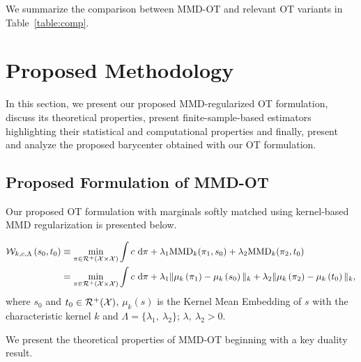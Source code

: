 We summarize the comparison between MMD-OT and relevant OT variants in Table~\ref{table:comp}.
\section{Proposed Methodology}\label{sec:main}
In this section, we present our proposed MMD-regularized OT formulation, discuss its theoretical properties, present finite-sample-based estimators highlighting their statistical and computational properties and finally, present and analyze the proposed barycenter obtained with our OT formulation.
\subsection{Proposed Formulation of MMD-OT}
Our proposed OT formulation with marginals softly matched using kernel-based MMD regularization is presented below.
\begin{definitionBox}
\vspace{-0.15in}
\begin{align}\label{eqn:proposed}
\mathcal{W}_{k, c, \Lambda}\left(s_0,t_0\right)&\equiv\min\limits_{\pi\in\mathcal{R}^+\left(\mathcal{X}\times\mathcal{X}\right)} \int c ~\textup{d}\pi + \lambda_1 \textup{MMD}_k(\pi_1, s_0) 
    + \lambda_2 \textup{MMD}_k(\pi_2, t_0) \nonumber\\
    &= \min\limits_{\pi\in\mathcal{R}^+\left(\mathcal{X}\times\mathcal{X}\right)} \int c ~\textup{d}\pi + \lambda_1 \|\mu_k\left(\pi_1\right)-\mu_k\left(s_0\right)\|_k+ \lambda_2 \|\mu_k\left(\pi_2\right)-\mu_k\left(t_0\right)\|_k,
\end{align}
where $s_0$ and $t_0\in \mathcal{R}^+(\mathcal{X})$, $\mu_k(s)$ is the Kernel Mean Embedding of $s$ with the characteristic kernel $k$ and $\Lambda=\{\lambda_1,\ \lambda_2\}$; $\lambda,\ \lambda_2>0$.
\end{definitionBox}

\noindent We present the theoretical properties of MMD-OT beginning with a key duality result.
